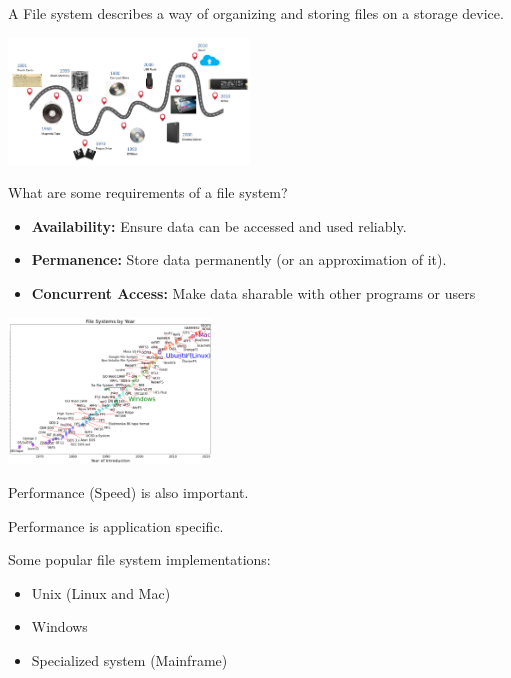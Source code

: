 \begin{slide}


    A File system describes a way of organizing and storing files on a storage device.

    \includegraphics[width=64mm]{file-system-hardware.jpg}
    
    What are some requirements of a file system?
    \begin{itemize}
        \item \textbf{Availability:} Ensure data can be accessed and used reliably.
        \item \textbf{Permanence:} Store data permanently (or an approximation of it).
        \item \textbf{Concurrent Access:} Make data sharable with other programs or users
    \end{itemize}

\end{slide}

\begin{slide}


	\begin{minipage}{0.45\textwidth}
        \includegraphics[width=54mm]{file-system-implementation.png}
    \end{minipage}
    \hfill
    \begin{minipage}{0.52\textwidth}
		Performance (Speed) is also important.
		\bigskip
		
		Performance is application specific.
		\bigskip
		
		Some popular file system implementations: 
		\begin{itemize}
			\item Unix (Linux and Mac)
			\item Windows
			\item Specialized system (Mainframe)
		\end{itemize}
    \end{minipage}
	    
\end{slide}

